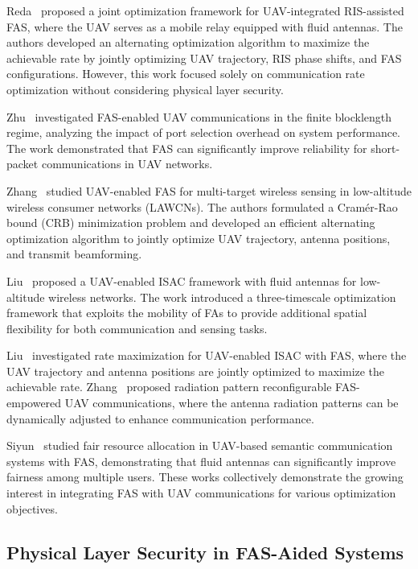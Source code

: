 Reda~\cite{reda2026uav} proposed a joint optimization framework for UAV-integrated RIS-assisted FAS, where the UAV serves as a mobile relay equipped with fluid antennas. The authors developed an alternating optimization algorithm to maximize the achievable rate by jointly optimizing UAV trajectory, RIS phase shifts, and FAS configurations. However, this work focused solely on communication rate optimization without considering physical layer security.

Zhu~\cite{zhu2026uav} investigated FAS-enabled UAV communications in the finite blocklength regime, analyzing the impact of port selection overhead on system performance. The work demonstrated that FAS can significantly improve reliability for short-packet communications in UAV networks.

Zhang~\cite{zhang2026uav} studied UAV-enabled FAS for multi-target wireless sensing in low-altitude wireless consumer networks (LAWCNs). The authors formulated a Cramér-Rao bound (CRB) minimization problem and developed an efficient alternating optimization algorithm to jointly optimize UAV trajectory, antenna positions, and transmit beamforming.

Liu~\cite{liu2026uav} proposed a UAV-enabled ISAC framework with fluid antennas for low-altitude wireless networks. The work introduced a three-timescale optimization framework that exploits the mobility of FAs to provide additional spatial flexibility for both communication and sensing tasks.

Liu~\cite{liu2025rate} investigated rate maximization for UAV-enabled ISAC with FAS, where the UAV trajectory and antenna positions are jointly optimized to maximize the achievable rate. Zhang~\cite{zhang2026radiation} proposed radiation pattern reconfigurable FAS-empowered UAV communications, where the antenna radiation patterns can be dynamically adjusted to enhance communication performance.

Siyun~\cite{siyun2025fair} studied fair resource allocation in UAV-based semantic communication systems with FAS, demonstrating that fluid antennas can significantly improve fairness among multiple users. These works collectively demonstrate the growing interest in integrating FAS with UAV communications for various optimization objectives.

\subsection{Physical Layer Security in FAS-Aided Systems}

